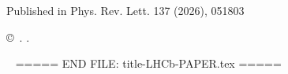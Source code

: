 \begin{titlepage}
\vspace*{2.0cm}

\begin{center}
  Published in Phys. Rev. Lett. 137 (2026), 051803
\end{center}

\vspace{\fill}

{\footnotesize

\centerline{\copyright~\papercopyright. \href{\paperlicenceurl}{\paperlicence}.}}
\vspace*{2mm}

\end{titlepage}







\newpage
\setcounter{page}{2}
\mbox{~}
===== END FILE: title-LHCb-PAPER.tex =====
